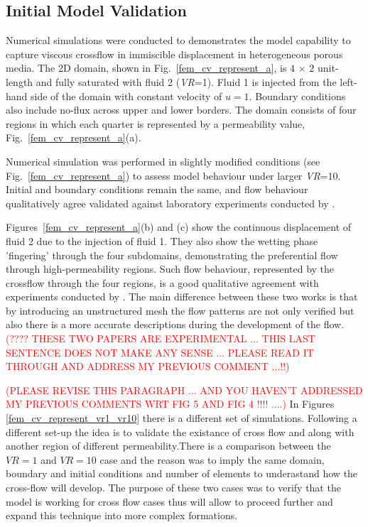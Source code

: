 \documentclass[preprint,authoryear,12pt]{elsarticle}
\newcommand{\red}{\textcolor{red}}
\begin{document}
\subsection{Initial Model Validation}\label{section:results_validation}
Numerical simulations \citep[based on lab experiments due to][]{evans_1994,dawe_2008} were conducted to demonstrates the model capability to capture viscous crossflow in immiscible displacement in heterogeneous porous media. The 2D domain, shown in Fig.~\ref{fem_cv_represent_a}, is $4$ $\times$ $2$ unit-length and fully saturated with fluid 2 ({\it VR}=1). Fluid 1 is injected from the left-hand side of the domain with constant velocity of $u=1$. Boundary conditions also include no-flux across upper and lower borders. The domain consists of four regions in which each quarter is represented by a permeability value, Fig.~\ref{fem_cv_represent_a}(a).

Numerical simulation was performed in slightly modified conditions (see Fig.~\ref{fem_cv_represent_a}) to assess model behaviour under larger {\it VR}=10. Initial and boundary conditions remain the same, and flow behaviour qualitatively agree validated against laboratory experiments conducted by \citet{evans_1994}.

Figures~\ref{fem_cv_represent_a}(b) and (c) show the continuous displacement of fluid 2 due to the injection of fluid 1. They also show the wetting phase 'fingering' through the four subdomains, demonstrating the preferential flow through high-permeability regions. Such flow behaviour, represented by the crossflow through the four regions, is a good qualitative agreement with experiments conducted by \citet{dawe_2008}. The main difference between these two works is that by introducing an unstructured mesh the flow patterns are not only verified but also there is a more accurate descriptions during the development of the flow. \red{(???? THESE TWO PAPERS ARE EXPERIMENTAL ... THIS LAST SENTENCE DOES NOT MAKE ANY SENSE ... PLEASE READ IT THROUGH AND ADDRESS MY PREVIOUS COMMENT ...!!)} 
    
\red{(PLEASE REVISE THIS PARAGRAPH ... AND YOU HAVEN'T ADDRESSED MY PREVIOUS COMMENTS WRT FIG 5 AND FIG 4 !!!! ....)}
In Figures \ref{fem_cv_represent_vr1_vr10} there is a different set of simulations. Following a different set-up the idea is to validate the existance of cross flow and along with another region of different permeability.There is a comparison between the $VR=1$ and $VR=10$ case and the reason was to imply the same domain, boundary and initial conditions and number of elements to underastand how the cross-flow will develop. The purpose of these two cases was to verify that the model is working for cross flow cases thus will allow to proceed further and expand this technique into more complex formations.    
 
\end{document}
